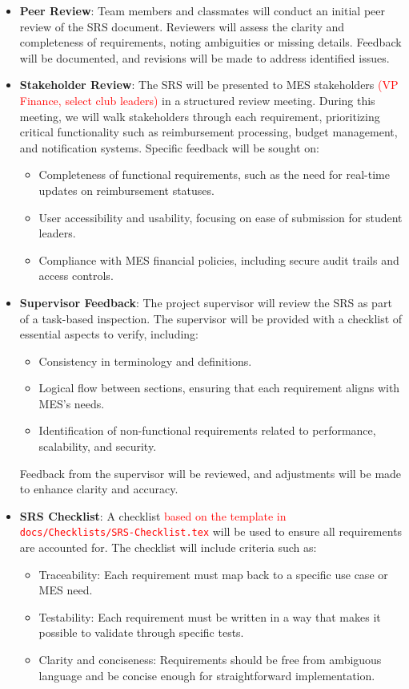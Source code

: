 \documentclass[12pt, titlepage]{article}
\begin{document}
\begin{itemize}
    \item \textbf{Peer Review}: Team members and classmates will conduct an initial peer review of the SRS document. Reviewers will assess the clarity and completeness of requirements, noting ambiguities or missing details. Feedback will be documented, and revisions will be made to address identified issues.

    \item \textbf{Stakeholder Review}: The SRS will be presented to MES stakeholders \textcolor{red}{(VP Finance, select club leaders)} in a structured review meeting. During this meeting, we will walk stakeholders through each requirement, prioritizing critical functionality such as reimbursement processing, budget management, and notification systems. Specific feedback will be sought on:
    \begin{itemize}
        \item Completeness of functional requirements, such as the need for real-time updates on reimbursement statuses.
        \item User accessibility and usability, focusing on ease of submission for student leaders.
        \item Compliance with MES financial policies, including secure audit trails and access controls.
    \end{itemize}

    \item \textbf{Supervisor Feedback}: The project supervisor will review the SRS as part of a task-based inspection. The supervisor will be provided with a checklist of essential aspects to verify, including:
    \begin{itemize}
        \item Consistency in terminology and definitions.
        \item Logical flow between sections, ensuring that each requirement aligns with MES’s needs.
        \item Identification of non-functional requirements related to performance, scalability, and security.
    \end{itemize}
    Feedback from the supervisor will be reviewed, and adjustments will be made to enhance clarity and accuracy.

    \item \textbf{SRS Checklist}: A checklist \textcolor{red}{based on the template in \texttt{docs/Checklists/SRS-Checklist.tex}} will be used to ensure all requirements are accounted for. The checklist will include criteria such as:
    \begin{itemize}
        \item Traceability: Each requirement must map back to a specific use case or MES need.
        \item Testability: Each requirement must be written in a way that makes it possible to validate through specific tests.
        \item Clarity and conciseness: Requirements should be free from ambiguous language and be concise enough for straightforward implementation.
    \end{itemize}
\end{itemize}
\end{document}
